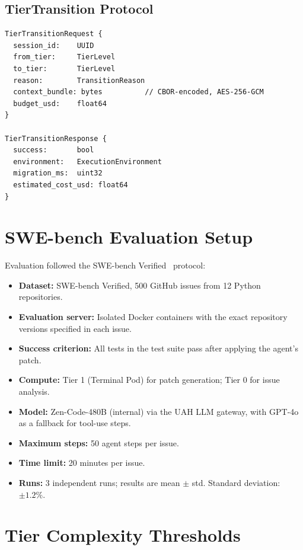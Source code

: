 \documentclass[11pt]{article}
\begin{document}
\subsection{TierTransition Protocol}

\begin{verbatim}
TierTransitionRequest {
  session_id:    UUID
  from_tier:     TierLevel
  to_tier:       TierLevel
  reason:        TransitionReason
  context_bundle: bytes          // CBOR-encoded, AES-256-GCM
  budget_usd:    float64
}

TierTransitionResponse {
  success:       bool
  environment:   ExecutionEnvironment
  migration_ms:  uint32
  estimated_cost_usd: float64
}
\end{verbatim}

\section{SWE-bench Evaluation Setup}
\label{app:swebench-setup}

Evaluation followed the SWE-bench Verified~\cite{jimenez2024swebench}
protocol:
\begin{itemize}[leftmargin=1.5em]
    \item \textbf{Dataset:} SWE-bench Verified, 500 GitHub issues from 12
          Python repositories.
    \item \textbf{Evaluation server:} Isolated Docker containers with the
          exact repository versions specified in each issue.
    \item \textbf{Success criterion:} All tests in the test suite pass after
          applying the agent's patch.
    \item \textbf{Compute:} Tier 1 (Terminal Pod) for patch generation;
          Tier 0 for issue analysis.
    \item \textbf{Model:} Zen-Code-480B (internal) via the UAH LLM gateway,
          with GPT-4o as a fallback for tool-use steps.
    \item \textbf{Maximum steps:} 50 agent steps per issue.
    \item \textbf{Time limit:} 20 minutes per issue.
    \item \textbf{Runs:} 3 independent runs; results are mean $\pm$ std.
          Standard deviation: $\pm 1.2\%$.
\end{itemize}

\section{Tier Complexity Thresholds}
\label{app:thresholds}
\end{document}
